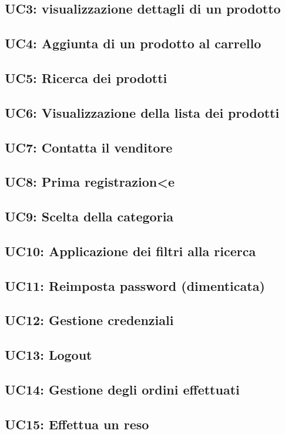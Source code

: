         \subsection{UC3: visualizzazione dettagli di un prodotto}
        \subsection{UC4: Aggiunta di un prodotto al carrello}
        \subsection{UC5: Ricerca dei prodotti}
        \subsection{UC6: Visualizzazione della lista dei prodotti}
        \subsection{UC7: Contatta il venditore}
        \subsection{UC8: Prima registrazion<e}
        \subsection{UC9: Scelta della categoria}
        \subsection{UC10: Applicazione dei filtri alla ricerca}
        \subsection{UC11: Reimposta password (dimenticata)}
        \subsection{UC12: Gestione credenziali}
        \subsection{UC13: Logout}
        \subsection{UC14: Gestione degli ordini effettuati}
        \subsection{UC15: Effettua un reso}
